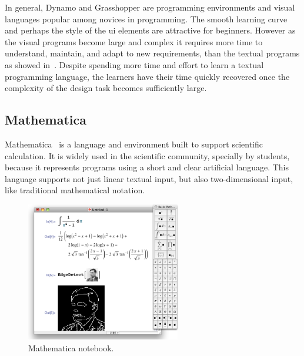 In general, Dynamo and Grasshopper are programming environments and visual languages popular among novices in programming. The smooth learning curve and perhaps the style of the \gls{ui} elements are attractive for beginners. However as the visual programs become large and complex it requires more time to understand, maintain, and adapt to new requirements, than the textual programs as showed in~\cite{leitao2011programming}. Despite spending more time and effort to learn a textual programming language, the learners have their time quickly recovered once the complexity of the design task becomes sufficiently large.
\subsection{Mathematica}
\label{subsec:mathematica}
Mathematica~\cite{wolfram1991mathematica} is a language and environment built to support scientific calculation. It is widely used in the scientific community, specially by students, because it represents programs using a short and clear artificial language. This language supports not just linear textual input, but also two-dimensional input, like traditional mathematical notation.

\begin{figure}
  \vspace{-15pt}
  \begin{center}
    \includegraphics[width=0.6\textwidth]{images/mathematica}
  \end{center}
  \vspace{-10pt}
 \caption{Mathematica notebook.}  
    \label{fig:math}
\end{figure}

